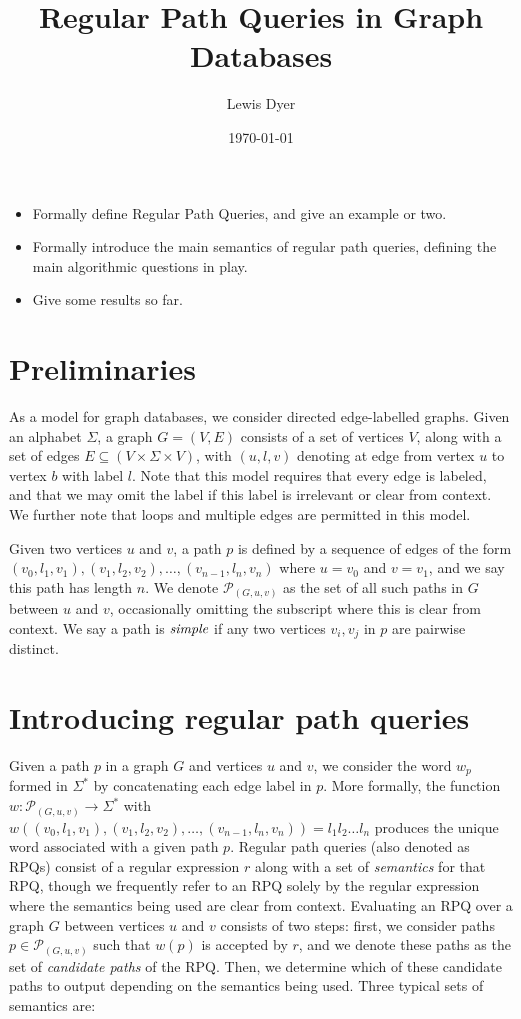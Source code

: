\documentclass{article}
\title{Regular Path Queries in Graph Databases}
\date{\today}
\author{Lewis Dyer}
\begin{document}
\maketitle

\begin{itemize}
    \item Formally define Regular Path Queries, and give an example or two.
    \item Formally introduce the main semantics of regular path queries, defining the main algorithmic questions in play.
    \item Give some results so far.
\end{itemize}

\section{Preliminaries}
\label{sec:prelims}

As a model for graph databases, we consider directed edge-labelled graphs. Given an alphabet $\Sigma$, a graph $G = (V,E)$ consists of a set of vertices $V$, along with a set of edges $E \subseteq (V \times \Sigma \times V)$, with $(u, l, v)$ denoting at edge from vertex $u$ to vertex $b$ with label $l$. Note that this model requires that every edge is labeled, and that we may omit the label if this label is irrelevant or clear from context. We further note that loops and multiple edges are permitted in this model.

Given two vertices $u$ and $v$, a path $p$ is defined by a sequence of edges of the form $(v_0, l_1, v_1), (v_1, l_2, v_2), \dots, (v_{n-1}, l_n, v_n)$ where $u = v_0$ and $v = v_1$, and we say this path has length $n$. We denote $\mathcal{P}_(G, u ,v)$ as the set of all such paths in $G$ between $u$ and $v$, occasionally omitting the subscript where this is clear from context.  We say a path is $\emph{simple}$ if any two vertices $v_i, v_j$ in $p$ are pairwise distinct.

\section{Introducing regular path queries}
\label{sec:intro_rpqs}

Given a path $p$ in a graph $G$ and vertices $u$ and $v$, we consider the word $w_p$ formed in $\Sigma^*$ by concatenating each edge label in $p$. More formally, the function $w: \mathcal{P}_{(G,u,v)} \rightarrow \Sigma^*$ with $w \left((v_0, l_1, v_1), (v_1, l_2, v_2), \dots, (v_{n-1}, l_n, v_n) \right) = l_1 l_2 \dots l_n$ produces the unique word associated with a given path $p$. Regular path queries (also denoted as RPQs) consist of a regular expression $r$ along with a set of \emph{semantics} for that RPQ, though we frequently refer to an RPQ solely by the regular expression where the semantics being used are clear from context. Evaluating an RPQ over a graph $G$ between vertices $u$ and $v$ consists of two steps: first, we consider paths $p \in \mathcal{P}_{(G,u,v)}$ such that $w(p)$ is accepted by $r$, and we denote these paths as the set of \emph{candidate paths} of the RPQ. Then, we determine which of these candidate paths to output depending on the semantics being used. Three typical sets of semantics are:
\end{document}
